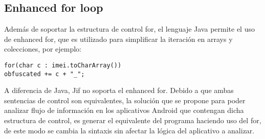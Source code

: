 
\subsection{Enhanced for loop}
\label{seubsec:enh}
Además de soportar la estructura de control for, el lenguaje Java permite el uso
de enhanced for, que es utilizado para simplificar la iteración en arrays y
colecciones, por ejemplo:
\begin{lstlisting}
for(char c : imei.toCharArray())
obfuscated += c + "_";
\end{lstlisting}
A diferencia de Java, Jif no soporta el enhanced for.\newline
Debido a que ambas sentencias de control son equivalentes, la solución que se
propone para poder analizar flujo de información en los aplicativos Android que
contengan dicha estructura de control, es generar el equivalente del programa
haciendo uso del for, de este modo se cambia la sintaxis sin afectar la lógica
del aplicativo a analizar.

